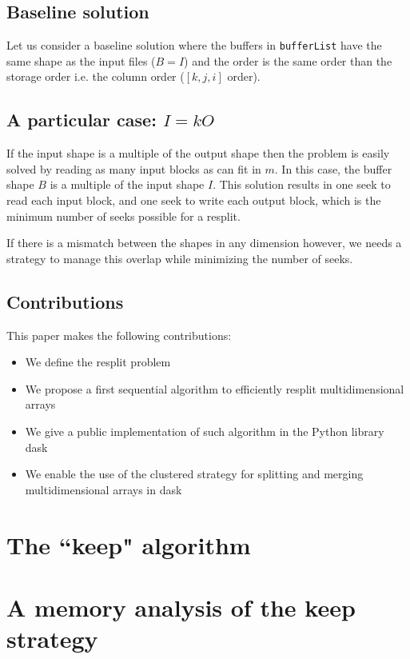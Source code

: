 \documentclass[conference]{IEEEtran}
\begin{document}
\subsection{Baseline solution}

Let us consider a baseline solution where the buffers in
\texttt{bufferList} have the same shape as the input files ($B=I$) and the
order is the same order than the storage order i.e. the column order ($[k,
j, i]$ order).


\subsection{A particular case: $I=kO$}

If the input shape is a multiple of the output shape then the problem
is easily solved by reading as many input blocks as can fit in $m$. In this case, the buffer
shape $B$ is a multiple of the input shape $I$. This solution results in
one seek to read each input block, and one seek to write each output block, which is
the minimum number of seeks possible for a resplit.

If there is a mismatch between the shapes in any dimension however, we
needs a strategy to manage this overlap while minimizing the number of
seeks.

\subsection{Contributions}
This paper makes the following contributions:
\begin{itemize}
  \item We define the resplit problem
  \item We propose a first sequential algorithm to efficiently resplit multidimensional arrays
  \item We give a public implementation of such algorithm in the Python library dask
  \item We enable the use of the clustered strategy for splitting and merging multidimensional arrays in dask
\end{itemize}

\section{The ``keep" algorithm}

\section{A memory analysis of the keep strategy}
\end{document}
